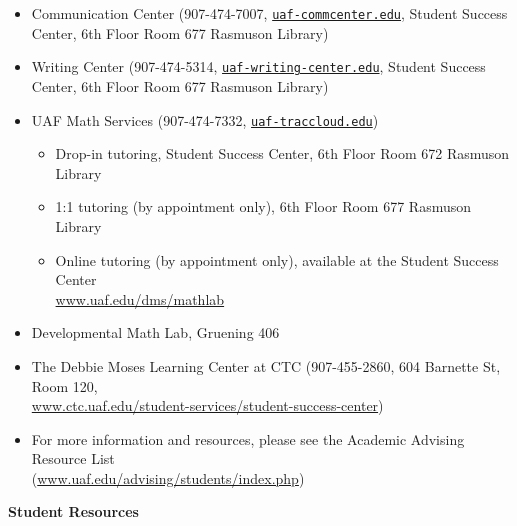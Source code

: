 \documentclass[12pt]{article}
\renewcommand{\emph}[1]{\textsf{\textbf{#1}}}
\newcommand{\localhead}[1]{\par\smallskip\textbf{#1} \smallskip\nobreak\\}%
\def\subheading#1{\localhead{\emph{#1}}}
\begin{document}
\vspace{-10mm}
\begin{itemize}
\setlength\itemsep{0em}
        \item Communication Center (907-474-7007, \href{mailto:uaf-commcenter@alaska.edu}{\texttt{uaf-commcenter\@@alaska.edu}}, Student Success Center, 6th Floor Room 677 Rasmuson Library)
        \item Writing Center (907-474-5314, \href{mailto:uaf-writing-center@alaska.edu}{\texttt{uaf-writing-center\@@alaska.edu}}, Student Success Center, 6th Floor Room 677 Rasmuson Library)
\item UAF Math Services (907-474-7332, \href{mailto:uaf-traccloud@alaska.edu}{\texttt{uaf-traccloud\@@alaska.edu}})


\begin{itemize}
\item Drop-in tutoring, Student Success Center, 6th Floor Room 672 Rasmuson Library

\item 1:1 tutoring (by appointment only), 6th Floor Room 677 Rasmuson Library

\item Online tutoring (by appointment only), available at the Student Success Center \\ \href{https://www.uaf.edu/dms/mathlab/}{www.uaf.edu/dms/mathlab}
\end{itemize}

\item Developmental Math Lab, Gruening 406
\item The Debbie Moses Learning Center at CTC (907-455-2860, 604 Barnette St, Room 120,\\ \href{https://www.ctc.uaf.edu/student-services/student-success-center/}{www.ctc.uaf.edu/student-services/student-success-center})
\item For more information and resources, please see the Academic Advising Resource List \\ (\href{https://www.uaf.edu/advising/students/index.php}{www.uaf.edu/advising/students/index.php})
\end{itemize}

\subheading{Student Resources}
\end{document}
